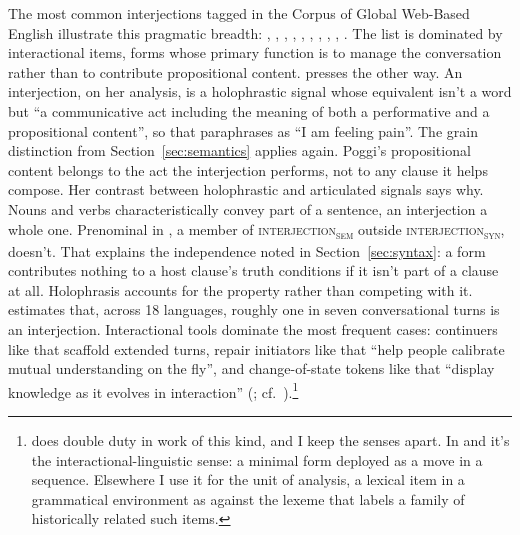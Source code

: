 \documentclass[12pt]{article}
\newcommand{\intj}[1]{\textsc{interjection\textsubscript{#1}}}
\begin{document}
The most common interjections tagged in the Corpus of Global Web-Based
English \citep[GloWbE;][]{daviesfuchs2015} illustrate this pragmatic breadth: , ,
, , , , ,
, , . The list is dominated by
interactional items, forms whose primary function is to manage the
conversation rather than to contribute propositional content.
\textcite[171]{poggi2009} presses the other way. An interjection, on her
analysis, is a holophrastic signal whose equivalent isn't a word but
\enquote{a communicative act including the meaning of both a performative and
a propositional content}, so that  paraphrases as \enquote{I am
feeling pain}. The grain distinction from Section~\ref{sec:semantics} applies
again. Poggi's propositional content belongs to the act the interjection
performs, not to any clause it helps compose. Her contrast between holophrastic
and articulated signals says why. Nouns and verbs characteristically convey part of a
sentence, an interjection a whole one. Prenominal  in
, a member of \intj{sem} outside \intj{syn}, doesn't. That explains the independence noted in
Section~\ref{sec:syntax}: a form contributes nothing to a host clause's truth
conditions if it isn't part of a clause at all. Holophrasis accounts for the
property rather than competing with it.
\textcite[257, 263]{dingemanse2024} estimates that, across 18 languages,
roughly one in seven conversational turns is an interjection. Interactional
tools dominate the most frequent cases: continuers like  that
scaffold extended turns, repair initiators like  that
\enquote{help people calibrate mutual understanding on the fly}, and
change-of-state tokens like  that \enquote{display knowledge as
it evolves in interaction} (\citealp[257]{dingemanse2024}; cf.\
\citealp[868, 870]{norrick2009}).\footnote{%
   does double duty in work of this kind, and I keep the senses
  apart. In \term{change-of-state token} and \term{response token} it's the
  interactional-linguistic sense: a minimal form deployed as a move in a
  sequence. Elsewhere I use it for the unit of analysis, a lexical item in a
  grammatical environment as against the lexeme that labels a family of
  historically related such items.}
\end{document}
